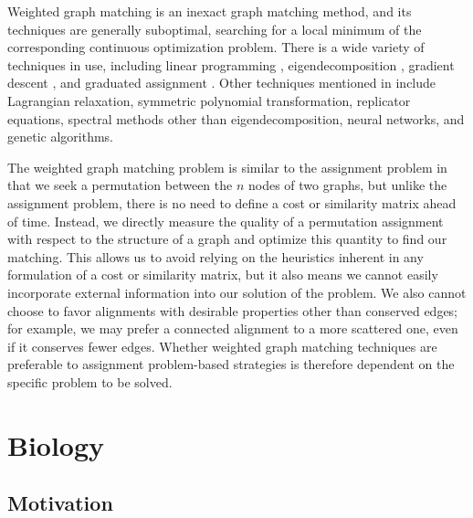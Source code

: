 \documentclass[12pt]{thesis}
\theoremstyle{plain}
\theoremstyle{definition}
\theoremstyle{remark}
\begin{document}
Weighted graph matching is an inexact graph matching method, and its techniques are generally suboptimal, searching for a local minimum of the corresponding continuous optimization problem. There is a wide variety of techniques in use, including linear programming \cite{Almohamad_1993}, eigendecomposition \cite{Umeyama_1988}, gradient descent \cite{Koutra_2013}, and graduated assignment \cite{Gold_1996}. Other techniques mentioned in \cite{Almohamad_1993, Umeyama_1988, Gold_1996, Conte_2004} include Lagrangian relaxation, symmetric polynomial transformation, replicator equations, spectral methods other than eigendecomposition, neural networks, and genetic algorithms.

The weighted graph matching problem is similar to the assignment problem in that we seek a permutation between the $n$ nodes of two graphs, but unlike the assignment problem, there is no need to define a cost or similarity matrix ahead of time. Instead, we directly measure the quality of a permutation assignment with respect to the structure of a graph and optimize this quantity to find our matching. This allows us to avoid relying on the heuristics inherent in any formulation of a cost or similarity matrix, but it also means we cannot easily incorporate external information into our solution of the problem. We also cannot choose to favor alignments with desirable properties other than conserved edges; for example, we may prefer a connected alignment to a more scattered one, even if it conserves fewer edges. Whether weighted graph matching techniques are preferable to assignment problem-based strategies is therefore dependent on the specific problem to be solved. 
















\chapter{Biology}\label{chapter:systems_biology}

\section{Motivation}
\end{document}
